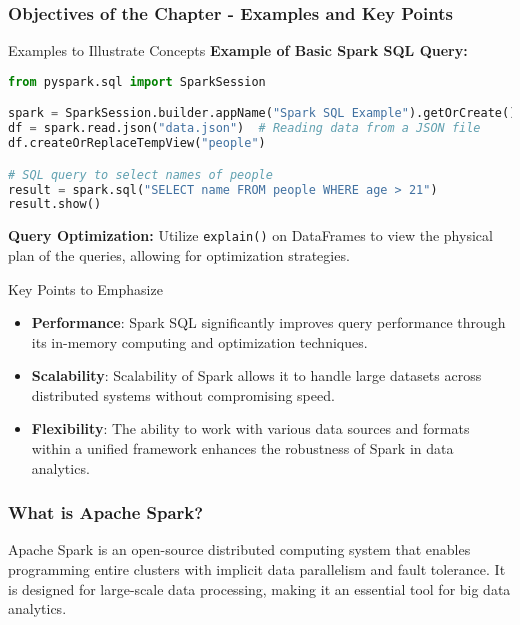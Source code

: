 \documentclass[aspectratio=169]{beamer}
\begin{document}
\begin{frame}[fragile]
    \frametitle{Objectives of the Chapter - Examples and Key Points}
    \begin{block}{Examples to Illustrate Concepts}
        \textbf{Example of Basic Spark SQL Query:}
        \begin{lstlisting}[language=Python]
from pyspark.sql import SparkSession

spark = SparkSession.builder.appName("Spark SQL Example").getOrCreate()
df = spark.read.json("data.json")  # Reading data from a JSON file
df.createOrReplaceTempView("people")

# SQL query to select names of people
result = spark.sql("SELECT name FROM people WHERE age > 21")
result.show()
        \end{lstlisting}

        \textbf{Query Optimization:}
        Utilize \texttt{explain()} on DataFrames to view the physical plan of the queries, allowing for optimization strategies.
    \end{block}

    \begin{block}{Key Points to Emphasize}
        \begin{itemize}
            \item \textbf{Performance}: Spark SQL significantly improves query performance through its in-memory computing and optimization techniques.
            \item \textbf{Scalability}: Scalability of Spark allows it to handle large datasets across distributed systems without compromising speed.
            \item \textbf{Flexibility}: The ability to work with various data sources and formats within a unified framework enhances the robustness of Spark in data analytics.
        \end{itemize}
    \end{block}
\end{frame}

\begin{frame}[fragile]
    \frametitle{What is Apache Spark?}
    Apache Spark is an open-source distributed computing system that enables programming entire clusters with implicit data parallelism and fault tolerance. 
    It is designed for large-scale data processing, making it an essential tool for big data analytics.
\end{frame}
\end{document}

